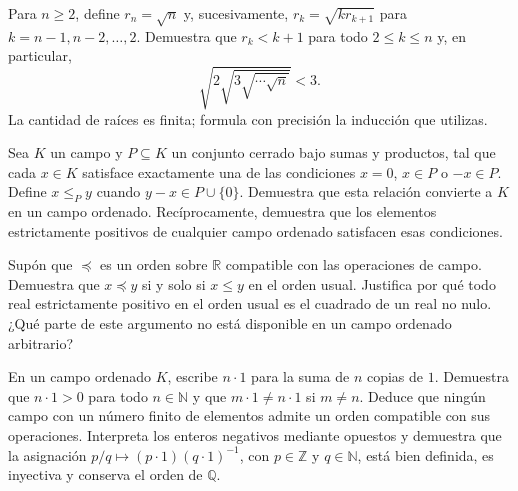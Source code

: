 \begin{samepage}
\begin{problem}\label{prob:reto-numeros-10}
Para $n\ge2$, define $r_n=\sqrt n$ y, sucesivamente, $r_k=\sqrt{k r_{k+1}}$ para $k=n-1,n-2,\ldots,2$. Demuestra que $r_k<k+1$ para todo $2\le k\le n$ y, en particular,
\[
\sqrt{2\sqrt{3\sqrt{\cdots\sqrt n}}}<3.
\]
La cantidad de raíces es finita; formula con precisión la inducción que utilizas.~\cite{mseRadicalAnidado}
\end{problem}
\end{samepage}
\par{}

\begin{samepage}
\begin{problem}\label{prob:reto-orden-01}
Sea $K$ un campo y $P\subseteq K$ un conjunto cerrado bajo sumas y productos, tal que cada $x\in K$ satisface exactamente una de las condiciones $x=0$, $x\in P$ o $-x\in P$. Define $x\le_P y$ cuando $y-x\in P\cup\{0\}$. Demuestra que esta relación convierte a $K$ en un campo ordenado. Recíprocamente, demuestra que los elementos estrictamente positivos de cualquier campo ordenado satisfacen esas condiciones.~\cite{mseCono}
\end{problem}
\end{samepage}
\par{}

\begin{samepage}
\begin{problem}\label{prob:reto-orden-02}
Supón que $\preccurlyeq$ es un orden sobre $\mathbb R$ compatible con las operaciones de campo. Demuestra que $x\preccurlyeq y$ si y solo si $x\le y$ en el orden usual. Justifica por qué todo real estrictamente positivo en el orden usual es el cuadrado de un real no nulo. ¿Qué parte de este argumento no está disponible en un campo ordenado arbitrario? \cite{mseOrdenUnico}
\end{problem}
\end{samepage}
\par{}

\begin{samepage}
\begin{problem}\label{prob:reto-orden-03}
En un campo ordenado $K$, escribe $n\cdot1$ para la suma de $n$ copias de $1$. Demuestra que $n\cdot1>0$ para todo $n\in\mathbb N$ y que $m\cdot1\ne n\cdot1$ si $m\ne n$. Deduce que ningún campo con un número finito de elementos admite un orden compatible con sus operaciones. Interpreta los enteros negativos mediante opuestos y demuestra que la asignación $p/q\mapsto(p\cdot1)(q\cdot1)^{-1}$, con $p\in\mathbb Z$ y $q\in\mathbb N$, está bien definida, es inyectiva y conserva el orden de $\mathbb Q$.
\end{problem}
\end{samepage}
\par{}

